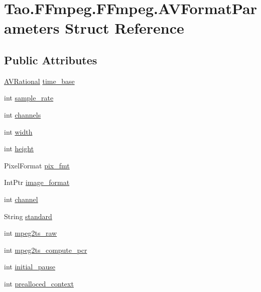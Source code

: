 \hypertarget{struct_tao_1_1_f_fmpeg_1_1_f_fmpeg_1_1_a_v_format_parameters}{
\section{Tao.FFmpeg.FFmpeg.AVFormatParameters Struct Reference}
\label{struct_tao_1_1_f_fmpeg_1_1_f_fmpeg_1_1_a_v_format_parameters}
}
\subsection*{Public Attributes}
\begin{DoxyCompactItemize}
\item 
\hyperlink{struct_tao_1_1_f_fmpeg_1_1_f_fmpeg_1_1_a_v_rational}{AVRational} \hyperlink{struct_tao_1_1_f_fmpeg_1_1_f_fmpeg_1_1_a_v_format_parameters_ad9f5705461268d3aec9f066dd6ce968b}{time\_\-base}
\item 
int \hyperlink{struct_tao_1_1_f_fmpeg_1_1_f_fmpeg_1_1_a_v_format_parameters_a6e2079c6a6e1d6fd8b3433146a5af2c0}{sample\_\-rate}
\item 
int \hyperlink{struct_tao_1_1_f_fmpeg_1_1_f_fmpeg_1_1_a_v_format_parameters_a0f4cf44371ee3add9aed581ce67b1b6d}{channels}
\item 
int \hyperlink{struct_tao_1_1_f_fmpeg_1_1_f_fmpeg_1_1_a_v_format_parameters_a62366f237d6c966993db5ccf3d8396ea}{width}
\item 
int \hyperlink{struct_tao_1_1_f_fmpeg_1_1_f_fmpeg_1_1_a_v_format_parameters_aed79d18d2c4a12176b2ff927d98d219a}{height}
\item 
PixelFormat \hyperlink{struct_tao_1_1_f_fmpeg_1_1_f_fmpeg_1_1_a_v_format_parameters_acdac0b98658feb16c9f5683626469ac5}{pix\_\-fmt}
\item 
IntPtr \hyperlink{struct_tao_1_1_f_fmpeg_1_1_f_fmpeg_1_1_a_v_format_parameters_a1fd9ac926ac7eb6f74868e3177d6e633}{image\_\-format}
\item 
int \hyperlink{struct_tao_1_1_f_fmpeg_1_1_f_fmpeg_1_1_a_v_format_parameters_a8076b0f1a7eb2c2821c3154ad4919865}{channel}
\item 
String \hyperlink{struct_tao_1_1_f_fmpeg_1_1_f_fmpeg_1_1_a_v_format_parameters_ac6ee06ef2961725eaaa608a740340609}{standard}
\item 
int \hyperlink{struct_tao_1_1_f_fmpeg_1_1_f_fmpeg_1_1_a_v_format_parameters_aa3c90ab1218c8888c65561a94e0e9e51}{mpeg2ts\_\-raw}
\item 
int \hyperlink{struct_tao_1_1_f_fmpeg_1_1_f_fmpeg_1_1_a_v_format_parameters_a7174db019f41c8d5dceaf87988dddd28}{mpeg2ts\_\-compute\_\-pcr}
\item 
int \hyperlink{struct_tao_1_1_f_fmpeg_1_1_f_fmpeg_1_1_a_v_format_parameters_a48e26f8205088d8f6d7dca3f42163f7e}{initial\_\-pause}
\item 
int \hyperlink{struct_tao_1_1_f_fmpeg_1_1_f_fmpeg_1_1_a_v_format_parameters_a8770f2ffeb2b5d875cde0e3c2749896d}{prealloced\_\-context}
\end{DoxyCompactItemize}


